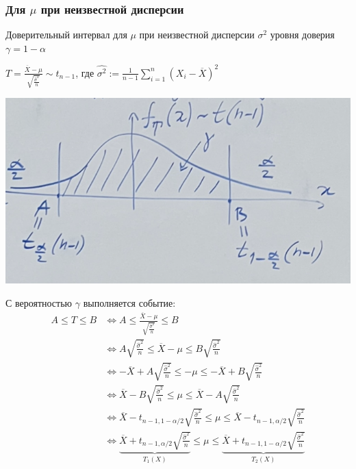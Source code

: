 \documentclass{article}
\begin{document}
\subsubsection{Для $\mu$ при неизвестной дисперсии}
Доверительный интервал для $\mu$ при неизвестной дисперсии $\sigma^2$ уровня доверия $\gamma=1-\alpha$

$T=\displaystyle\frac{\overline{X}-\mu}{\sqrt{\frac{\widehat{\sigma}^2}{n}}}\sim t_{n-1}$, где $\widehat{\sigma^{2}}:=\displaystyle\frac{1}{n-1} \sum_{i=1}^{n}\left(X_{i}-\overline{X}\right)^{2}$

\begin{center}
    \includegraphics[width=0.5\linewidth]{confidence_interval4.png}
\end{center}
С вероятностью $\gamma$ выполняется событие:
\begin{equation*}
    \begin{aligned}
        A\leqslant T\leqslant B&\Longleftrightarrow A\leqslant \frac{\overline{X}-\mu}{\sqrt{\frac{\widehat{\sigma}^2}{n}}}\leqslant B\\
        &\Longleftrightarrow A\sqrt{\frac{\widehat{\sigma}^2}{n}}\leqslant\overline{X}-\mu\leqslant B\sqrt{\frac{\widehat{\sigma}^2}{n}}\\
        &\Longleftrightarrow-\overline{X}+A\sqrt{\frac{\widehat{\sigma}^2}{n}}\leqslant-\mu\leqslant-\overline{X}+B\sqrt{\frac{\widehat{\sigma}^2}{n}}\\
        &\Longleftrightarrow\overline{X}-B\sqrt{\frac{\widehat{\sigma}^2}{n}}\leqslant\mu\leqslant\overline{X}-A\sqrt{\frac{\widehat{\sigma}^2}{n}}\\
        &\Longleftrightarrow\overline{X}-t_{n-1,1-\alpha/2}\sqrt{\frac{\widehat{\sigma}^2}{n}}\leqslant\mu\leqslant\overline{X}-t_{n-1,\alpha/2}\sqrt{\frac{\widehat{\sigma}^2}{n}}\\
        &\Longleftrightarrow\underbrace{\overline{X}+t_{n-1,\alpha/2}\sqrt{\frac{\widehat{\sigma}^2}{n}}}_{T_1(X)}\leqslant\mu\leqslant\underbrace{\overline{X}+t_{n-1,1-\alpha/2}\sqrt{\frac{\widehat{\sigma}^2}{n}}}_{T_2(X)}
    \end{aligned}
\end{equation*}
\end{document}
